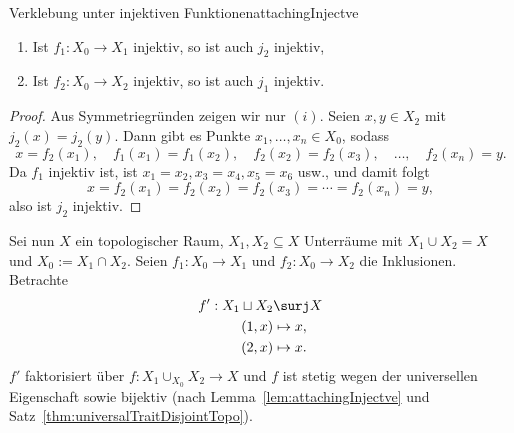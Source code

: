 \documentclass[language=ngerman]{TemplateLecture} %
\begin{document}
\begin{lem}{Verklebung unter injektiven Funktionen}{attachingInjectve}
    \begin{enumerate}[$(i)$]
        \item Ist $f_1: X_0 \to X_1$ injektiv, so ist auch $j_2$ injektiv,
        \item Ist $f_2: X_0 \to X_2$ injektiv, so ist auch $j_1$ injektiv.
    \end{enumerate}
\end{lem}
\begin{proof}
    Aus Symmetriegründen zeigen wir nur $(i)$. Seien $x,y \in X_2$ mit $j_2(x) = j_2(y)$. Dann gibt es Punkte $x_1, \ldots, x_n \in X_0$, sodass 
    \begin{equation*}
        x = f_2(x_1), \quad f_1(x_1) = f_1(x_2), \quad f_2(x_2) = f_2(x_3), \quad \ldots, \quad f_2(x_n) = y.
    \end{equation*}
    Da $f_1$ injektiv ist, ist $x_1 = x_2, x_3 = x_4, x_5 = x_6$ usw., und damit folgt
    \begin{equation*}
        x = f_2(x_1) = f_2(x_2) = f_2(x_3) = \cdots = f_2(x_n) = y,
    \end{equation*}
    also ist $j_2$ injektiv.
\end{proof}

Sei nun $X$ ein topologischer Raum, $X_1, X_2 \subseteq X$ Unterräume mit $X_1 \cup X_2 = X$ und $X_0 := X_1 \cap X_2$. Seien $f_1: X_0 \to X_1$ und $f_2: X_0 \to X_2$ die Inklusionen. Betrachte 
\begin{align*}
    f': X_1 \sqcup X_2 &\surj X \\
    (1,x) &\mapsto x, \\
    (2,x) &\mapsto x.
\end{align*}
$f'$ faktorisiert über $f: X_1 \cup_{X_0} X_2 \to X$ und $f$ ist stetig wegen der universellen Eigenschaft sowie bijektiv (nach Lemma~\ref{lem:attachingInjectve} und Satz~\ref{thm:universalTraitDisjointTopo}).
\end{document}
